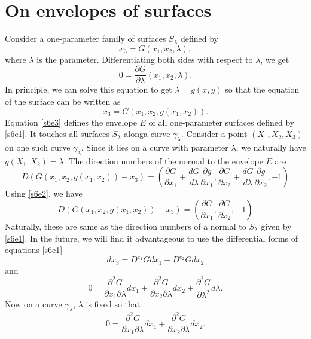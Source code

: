\documentclass{article}
\newcommand{\td}[2]{\frac{d{#1}}{d{#2}}}
\newcommand{\pd}[2]{\frac{\partial{#1}}{\partial{#2}}}
\theoremstyle{plain}
\numberwithin{thm}{section}
\theoremstyle{plain}
\numberwithin{prop}{section}
\theoremstyle{definition}
\numberwithin{defn}{section}
\theoremstyle{remark}
\numberwithin{equation}{section}
\begin{document}
\section{On envelopes of surfaces}\label{s6}\cite{fj}
Consider a one-parameter family of surfaces $S_\lambda$ defined by
\begin{equation}\label{s6e1}
x_3 = G(x_1, x_2, \lambda),
\end{equation}
where $\lambda$ is the parameter. Differentiating both sides with respect to $\lambda$, we get
\begin{equation}\label{s6e2}
0 = \pd{G}{\lambda}(x_1,x_2,\lambda).
\end{equation}
In principle, we can solve this equation to get $\lambda = g(x, y)$ so that the equation of the 
surface can be written as 
\begin{equation}\label{s6e3}
x_3 = G(x_1, x_2, g(x_1, x_2)).
\end{equation}
Equation \eqref{s6e3} defines the envelope $E$ of all one-parameter surfaces defined by \eqref{s6e1}.
It touches all surfaces $S_\lambda$ alonga curve $\gamma_\lambda$. Consider a point $(X_1, X_2, X_3)$
on one such curve $\gamma_\lambda$. Since it lies on a curve with parameter $\lambda$, we naturally
have $g(X_1, X_2) = \lambda$. The direction numbers of the normal to the envelope $E$ are
\[
D(G(x_1, x_2, g(x_1, x_2)) - x_3) = 
\left(\pd{G}{x_1} + \td{G}{\lambda}\pd{g}{x_1}, \pd{G}{x_2} + \td{G}{\lambda}\pd{g}{x_2}, -1\right)
\]
Using \eqref{s6e2}, we have
\[
D(G(x_1, x_2, g(x_1, x_2)) - x_3) = \left(\pd{G}{x_1}, \pd{G}{x_2}, -1\right)
\]
Naturally, these are same as the direction numbers of a normal to $S_\lambda$ given by \eqref{s6e1}. 
In the future, we will find it advantageous to use the differential forms of equations \eqref{s6e1}
\begin{equation}\label{s6e4}
dx_3 = D^{e_1}Gdx_1 + D^{e_2}Gdx_2
\end{equation}
and
\[
0 = \frac{\partial^2 G}{\partial x_1 \partial\lambda}dx_1 +
\frac{\partial^2 G}{\partial x_2 \partial\lambda}dx_2 + 
\frac{\partial^2 G}{\partial\lambda^2}d\lambda.
\]
Now on a curve $\gamma_\lambda$, $\lambda$ is fixed so that
\begin{equation}\label{s6e5}
0 = \frac{\partial^2 G}{\partial x_1 \partial\lambda}dx_1 + 
\frac{\partial^2 G}{\partial x_2 \partial\lambda}dx_2.
\end{equation}
\end{document}
